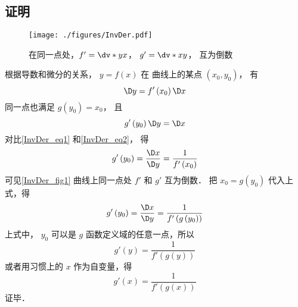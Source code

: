 \subsection{证明}
\begin{figure}[h]
\centering
\texttt{[image: ./figures/InvDer.pdf]}
\caption{在同一点处，$f'=\dv*{y}{x}$， $g'=\dv*{x}{y}$， 互为倒数}\label{InvDer_fig1}
\end{figure}
根据导数和微分的关系， $y = f\left( x \right)$ 在 曲线上的某点 $\left( {{x_0},{y_0}} \right)$， 有
 \begin{equation}\label{InvDer_eq1}
\D y = f'\left( {{x_0}} \right)\D x
\end{equation}
同一点也满足 $g\left( {{y_0}} \right) = {x_0}$， 且
 \begin{equation}\label{InvDer_eq2}
g'\left( {{y_0}} \right)\D y = \D x
\end{equation}
对比\autoref{InvDer_eq1} 和\autoref{InvDer_eq2}， 得
\begin{equation}
g'\left( {{y_0}} \right) = \frac{\D x}{\D y} = \frac{1}{{f'\left( {{x_0}} \right)}}
\end{equation}
可见\autoref{InvDer_fig1} 曲线上同一点处 $f'$ 和 $g'$ 互为倒数． 把 ${x_0} = g\left( {{y_0}} \right)$ 代入上式，得
\begin{equation}
g'\left( {{y_0}} \right) = \frac{\D x}{\D y} = \frac{1}{{f'\left( {g\left( {{y_0}} \right)} \right)}}
\end{equation} 
上式中， ${y_0}$ 可以是 $g$ 函数定义域的任意一点，所以
\begin{equation}
g'\left( y \right) = \frac{1}{{f'\left( {g\left( y \right)} \right)}}
\end{equation} 
或者用习惯上的 $x$ 作为自变量，得
\begin{equation}
g'\left( x \right) = \frac{1}{{f'\left( {g\left( x \right)} \right)}}
\end{equation}
证毕．
















